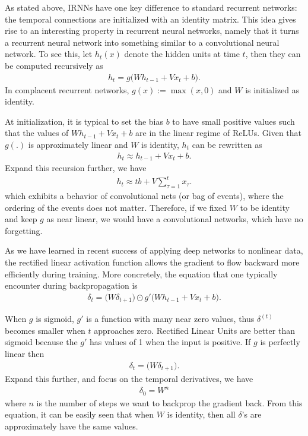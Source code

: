 \documentclass{article} \usepackage{nips14submit_e,times,graphicx}
\begin{document}
As stated above, IRNNs have one key difference to standard recurrent
networks: the temporal connections are initialized with an identity
matrix. This idea gives rise to an interesting property in recurrent
neural networks, namely that it turns a recurrent neural network into
something similar to a convolutional neural network. To see this, let
$h_t(x)$ denote the hidden units at time $t$, then they can be
computed recursively as
\begin{align}
h_t = g\big(W h_{t-1} + V x_t + b\big).
\end{align}
In complacent recurrent networks, $g(x) := \max(x,0)$ and $W$ is
initialized as identity.

At initialization, it is typical to set the bias $b$ to have small
positive values such that the values of $W h_{t-1} + V x_t + b$ are in
the linear regime of ReLUs. Given that $g(.)$ is approximately linear
and $W$ is identity, $h_t$ can be rewritten as
\begin{align}
h_t \approx h_{t-1} + V x_t + b.
\end{align}
Expand this recursion further, we have
\begin{align}
h_t \approx tb + V \sum_{\tau=1}^tx_{\tau}.
\label{eq:convnet}
\end{align}
which exhibits a behavior of convolutional nets (or bag of events),
where the ordering of the events does not matter. Therefore, if we
fixed $W$ to be identity and keep $g$ as near linear, we would
have a convolutional networks, which have no forgetting.

As we have learned in recent success of applying deep networks to
nonlinear data, the rectified linear activation function allows the
gradient to flow backward more efficiently during training. More
concretely, the equation that one typically encounter during
backpropagation is
\begin{align}
    \delta_{t} = \bigg( W \delta_{t+1}\bigg) \odot g'\bigg( W
    h_{t-1} + Vx_t + b\bigg).
\end{align}

When $g$ is sigmoid, $g'$ is a function with many near zero values,
thus $\delta^{(t)}$ becomes smaller when $t$ approaches
zero. Rectified Linear Units are better than sigmoid because the $g'$
has values of 1 when the input is positive. If $g$ is perfectly linear
then
\begin{align}
    \delta_{t} = \bigg(  W  \delta_{t+1}\bigg).  
\end{align}
Expand this further, and focus on the temporal derivatives, we have
\begin{align}
    \delta_{0} = W^{n}  
\end{align}
where $n$ is the number of steps we want to backprop the gradient
back. From this equation, it can be easily seen that when $W$ is
identity, then all $\delta$'s are approximately have the same values.
\end{document}
